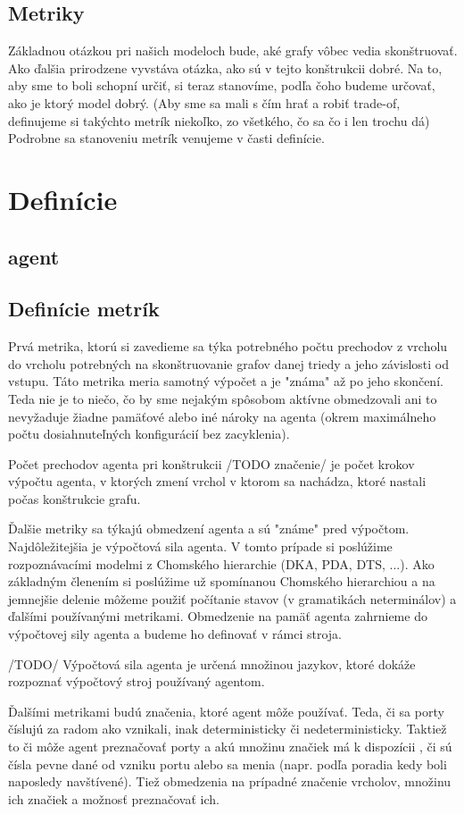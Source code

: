 \subsection{Metriky}
Základnou otázkou pri našich modeloch bude, aké grafy vôbec vedia skonštruovať. Ako ďalšia prirodzene vyvstáva otázka, ako sú v tejto konštrukcii dobré. Na to, aby sme to boli schopní určiť, si teraz stanovíme, podľa čoho budeme určovať, ako je ktorý model dobrý. (Aby sme sa mali s čím hrať a robiť trade-of, definujeme si takýchto metrík niekoľko, zo všetkého, čo sa čo i len trochu dá)
Podrobne sa stanoveniu metrík venujeme v časti definície.
\section{Definície}

\subsection{agent}


\subsection{Definície metrík}
Prvá metrika, ktorú si zavedieme sa týka potrebného počtu prechodov z vrcholu do vrcholu potrebných na skonštruovanie grafov danej triedy a jeho závislosti od vstupu. Táto metrika meria samotný výpočet a je "známa" až po jeho skončení. Teda nie je to niečo, čo by sme nejakým spôsobom aktívne obmedzovali ani to nevyžaduje žiadne pamäťové alebo iné nároky na agenta (okrem maximálneho počtu dosiahnuteľných konfigurácií bez zacyklenia).
\begin{defin}
Počet prechodov agenta pri konštrukcii /TODO značenie/ je počet krokov výpočtu agenta, v ktorých zmení vrchol v ktorom sa nachádza, ktoré nastali počas konštrukcie grafu.
\end{defin}
Ďalšie metriky sa týkajú obmedzení agenta a sú "známe" pred výpočtom. Najdôležitejšia je výpočtová sila agenta. V tomto prípade si poslúžime rozpoznávacími modelmi z Chomského hierarchie (DKA, PDA, DTS, ...). Ako základným členením si poslúžime už spomínanou Chomského hierarchiou a na jemnejšie delenie môžeme použiť počítanie stavov (v gramatikách neterminálov) a ďalšími používanými metrikami. Obmedzenie na pamäť agenta zahrnieme do výpočtovej sily agenta a budeme ho definovať v rámci stroja.
\begin{defin}
/TODO/ Výpočtová sila agenta je určená množinou jazykov, ktoré dokáže rozpoznať výpočtový stroj používaný agentom.
\end{defin}
Ďalšími metrikami budú značenia, ktoré agent môže používať. Teda, či sa porty číslujú za radom ako vznikali, inak deterministicky či nedeterministicky. Taktiež to či môže agent preznačovať porty a akú množinu značiek má k dispozícii , či sú čísla pevne dané od vzniku portu alebo sa menia (napr. podľa poradia kedy boli naposledy navštívené). Tiež obmedzenia na prípadné značenie vrcholov, množinu ich značiek a možnosť preznačovať ich.

